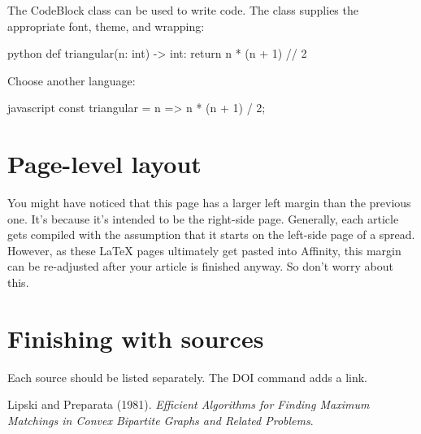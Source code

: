 \documentclass{visionen}
\begin{document}
\noindent The CodeBlock class can be used to write code. The class supplies the appropriate font, theme, and wrapping:

\begin{CodeBlock}{python}
def triangular(n: int) -> int:
    return n * (n + 1) // 2
\end{CodeBlock}

\noindent Choose another language:

\begin{CodeBlock}{javascript}
const triangular = n => n * (n + 1) / 2;
\end{CodeBlock}

\section{Page-level layout}

You might have noticed that this page has a larger left margin than the previous one. It's because it's intended to be the right-side page. Generally, each article gets compiled with the assumption that it starts on the left-side page of a spread. However, as these LaTeX pages ultimately get pasted into Affinity, this margin can be re-adjusted after your article is finished anyway. So don't worry about this.

\section*{Finishing with sources}

Each source should be listed separately. The DOI command adds a link.

\begin{GridReferences}
  \item Lipski and Preparata (1981).
  \textit{Efficient Algorithms for Finding Maximum Matchings in Convex Bipartite Graphs and Related Problems}.
\end{GridReferences}
\end{document}
